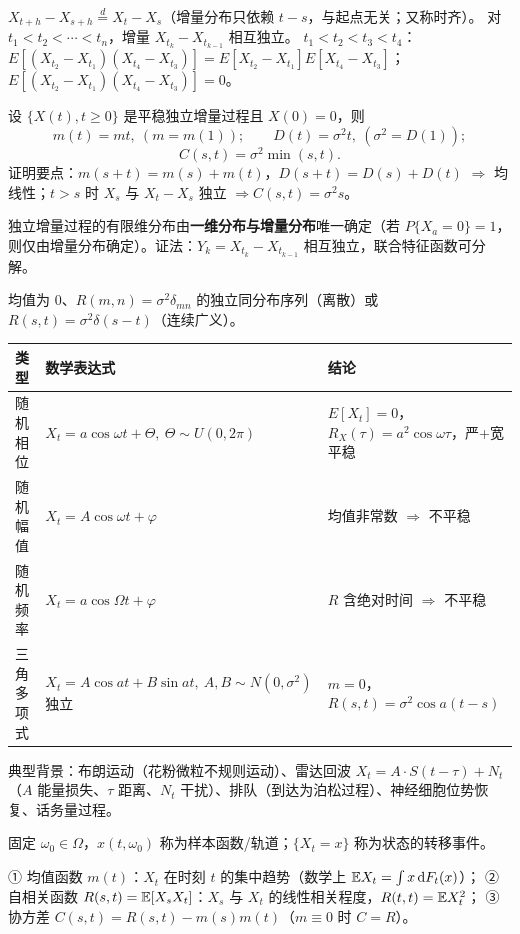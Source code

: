\documentclass[UTF8,12pt,a4paper]{ctexart}
\begin{document}
 $X_{t+h}-X_{s+h}\stackrel{d}{=}X_t-X_s$（增量分布只依赖 $t-s$，与起点无关；又称时齐）。
 对 $t_1<t_2<\cdots<t_n$，增量 $X_{t_{k}}-X_{t_{k-1}}$ 相互独立。
 $t_1<t_2<t_3<t_4$：$E[(X_{t_2}-X_{t_1})(X_{t_4}-X_{t_3})]=E[X_{t_2}-X_{t_1}]E[X_{t_4}-X_{t_3}]$；
 $E[(X_{t_2}-X_{t_1})(X_{t_4}-X_{t_3})]=0$。

 设 $\{X(t),t\ge0\}$ 是平稳独立增量过程且 $X(0)=0$，则
$$m(t)=mt,\ (m=m(1));\qquad D(t)=\sigma^2t,\ (\sigma^2=D(1));$$
$$C(s,t)=\sigma^2\min(s,t).$$
证明要点：$m(s+t)=m(s)+m(t)$，$D(s+t)=D(s)+D(t)$ $\Rightarrow$ 均线性；$t>s$ 时 $X_s$ 与 $X_t-X_s$ 独立 $\Rightarrow C(s,t)=\sigma^2s$。

 独立增量过程的有限维分布由\textbf{一维分布与增量分布}唯一确定（若 $P\{X_a=0\}=1$，则仅由增量分布确定）。证法：$Y_k=X_{t_k}-X_{t_{k-1}}$ 相互独立，联合特征函数可分解。

 均值为 $0$、$R(m,n)=\sigma^2\delta_{mn}$ 的独立同分布序列（离散）或 $R(s,t)=\sigma^2\delta(s-t)$（连续广义）。

\begin{center}\footnotesize
\begin{tabular}{p{1.44cm}p{2.76cm}p{4.44cm}}\hline
类型 & 数学表达式 & 结论\\\hline
随机相位 & $X_t=a\cos\omega t+\Theta,\ \Theta\sim U(0,2\pi)$ & $E[X_t]=0$，$R_X(\tau)=a^2\cos\omega\tau$，严+宽平稳\\
随机幅值 & $X_t=A\cos\omega t+\varphi$ & 均值非常数 $\Rightarrow$ 不平稳\\
随机频率 & $X_t=a\cos\Omega t+\varphi$ & $R$ 含绝对时间 $\Rightarrow$ 不平稳\\
三角多项式 & $X_t=A\cos at+B\sin at,\ A,B\sim N(0,\sigma^2)$ 独立 & $m=0$，$R(s,t)=\sigma^2\cos a(t-s)$\\\hline
\end{tabular}\end{center}


典型背景：布朗运动（花粉微粒不规则运动）、雷达回波 $X_t=A\cdot S(t-\tau)+N_t$（$A$ 能量损失、$\tau$ 距离、$N_t$ 干扰）、排队（到达为泊松过程）、神经细胞位势恢复、话务量过程。

 固定 $\omega_0\in\Omega$，$x(t,\omega_0)$ 称为样本函数/轨道；$\{X_t=x\}$ 称为状态的转移事件。

① 均值函数 $m(t)$：$X_t$ 在时刻 $t$ 的集中趋势（数学上 $\mathbb{E} X_t=\int x\,\mathrm{d} F_t(x)$）；
② 自相关函数 $R(s,t)=\mathbb{E}[X_sX_t]$：$X_s$ 与 $X_t$ 的线性相关程度，$R(t,t)=\mathbb{E} X_t^2$；
③ 协方差 $C(s,t)=R(s,t)-m(s)m(t)$（$m\equiv0$ 时 $C=R$）。
\end{document}
